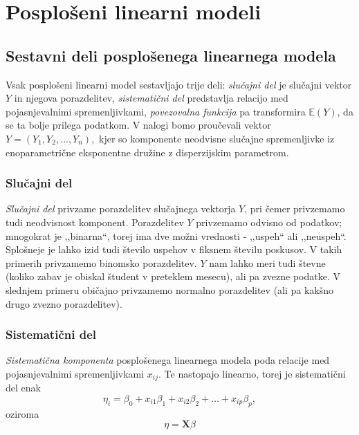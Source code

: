 \documentclass[12pt,a4paper]{amsart}
\theoremstyle{definition} %
\theoremstyle{plain} %
\begin{document}
\section{Posplošeni linearni modeli}

\subsection{Sestavni deli posplošenega linearnega modela}
Vsak posplošeni linearni model sestavljajo trije deli: \textit{slučajni del} je slučajni vektor $Y$ in njegova porazdelitev, 
\textit{sistematični del} predstavlja relacijo med pojasnjevalnimi spremenljivkami, \textit{povezovalna funkcija} pa transformira $\mathbb{E}(Y)$, da se ta
bolje prilega podatkom. V nalogi bomo proučevali vektor $Y = (Y_{1},Y_{2},\ldots,Y_{n}),$ kjer so komponente neodvisne slučajne spremenljivke iz enoparametrične
eksponentne družine z disperzijskim parametrom.

\subsubsection{Slučajni del}
\textit{Slučajni del} privzame porazdelitev slučajnega vektorja $Y$, pri čemer privzemamo tudi neodvisnost komponent. Porazdelitev $Y$
privzemamo odvisno od podatkov; mnogokrat je ,,binarna``, torej ima dve možni vrednosti - ,,uspeh`` ali ,,neuspeh``. Splošneje je lahko izid tudi 
število uspehov v fiksnem številu poskusov. V takih primerih privzamemo binomsko porazdelitev. $Y$ nam lahko meri tudi števne (koliko zabav je obiskal študent v preteklem mesecu), 
ali pa zvezne podatke. V slednjem primeru običajno privzamemo normalno porazdelitev (ali pa kakšno drugo zvezno porazdelitev).
\subsubsection{Sistematični del} 
\textit{Sistematična komponenta} posplošenega linearnega modela poda relacije med pojasnjevalnimi spremenljivkami $x_{ij}$. Te nastopajo 
linearno, torej je sistematični del enak
\[
\eta_{i} = \beta_{0} + x_{i1}\beta_{1} + x_{i2}\beta_{2} + \ldots + x_{ip}\beta_{p},
\]
oziroma
\[
    \eta = \mathbf{X}\beta
\]
\end{document}
